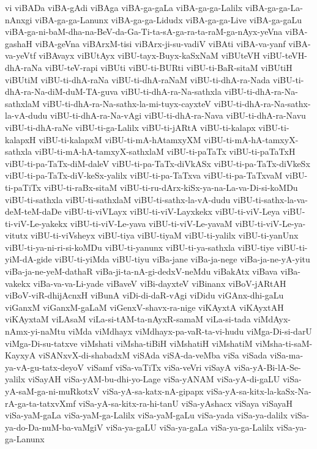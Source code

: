 {vi
viBADa
viBA-gAdi
viBAga
viBA-ga-gaLa
viBA-ga-ga-Lalilx
viBA-ga-ga-La-nAnxgi
viBA-ga-ga-Lanunx
viBA-ga-ga-Lidudx
viBA-ga-ga-Live
viBA-ga-gaLu
viBA-ga-ni-baM-dha-na-BeV-da-Ga-Ti-ta-sA-ga-ra-ta-raM-ga-nAyx-yeVna
viBA-gashaH
viBA-geVna
viBArxM-tisi
viBArx-ji-su-vadiV
viBAti
viBA-va-yanf
viBA-va-yeVtf
viBAvayx
viBUtAyx
viBU-tayx-Buyx-kaSxNaM
viBUteVH
viBU-teVH-dhA-raNa
viBU-teV-rapi
viBUti
viBU-ti-BURti
viBU-ti-BaR-sitaM
viBUtiH
viBUtiM
viBU-ti-dhA-raNa
viBU-ti-dhA-raNaM
viBU-ti-dhA-ra-Nada
viBU-ti-dhA-ra-Na-diM-duM-TA-guva
viBU-ti-dhA-ra-Na-sathxla
viBU-ti-dhA-ra-Na-sathxlaM
viBU-ti-dhA-ra-Na-sathx-la-mi-tuyx-cayxteV
viBU-ti-dhA-ra-Na-sathx-la-vA-dudu
viBU-ti-dhA-ra-Na-vAgi
viBU-ti-dhA-ra-Nava
viBU-ti-dhA-ra-Navu
viBU-ti-dhA-raNe
viBU-ti-ga-Lalilx
viBU-ti-jARtA
viBU-ti-kalapx
viBU-ti-kalapxH
viBU-ti-kalapxM
viBU-ti-mA-hAtamxyXM
viBU-ti-mA-hA-tamxyX-sathxla
viBU-ti-mA-hA-tamxyX-sathxlaM
viBU-ti-paTaTx
viBU-ti-paTaTxH
viBU-ti-pa-TaTx-diM-daleV
viBU-ti-pa-TaTx-diVkASx
viBU-ti-pa-TaTx-diVkeSx
viBU-ti-pa-TaTx-diV-keSx-yalilx
viBU-ti-pa-TaTxva
viBU-ti-pa-TaTxvaM
viBU-ti-paTiTx
viBU-ti-raBx-sitaM
viBU-ti-ru-dArx-kiSx-ya-na-La-va-Di-si-koMDu
viBU-ti-sathxla
viBU-ti-sathxlaM
viBU-ti-sathx-la-vA-dudu
viBU-ti-sathx-la-va-deM-teM-daDe
viBU-ti-viVLayx
viBU-ti-viV-Layxkekx
viBU-ti-viV-Leya
viBU-ti-viV-Le-yakekx
viBU-ti-viV-Le-yava
viBU-ti-viV-Le-yavaM
viBU-ti-viV-Le-ya-vitutx
viBU-ti-viVsheyx
viBU-tiya
viBU-tiyaM
viBU-ti-yalilx
viBU-ti-yanUnx
viBU-ti-ya-ni-ri-si-koMDu
viBU-ti-yanunx
viBU-ti-ya-sathxla
viBU-tiye
viBU-ti-yiM-dA-gide
viBU-ti-yiMda
viBU-tiyu
viBa-jane
viBa-ja-nege
viBa-ja-ne-yA-yitu
viBa-ja-ne-yeM-dathaR
viBa-ji-ta-nA-gi-dedxV-neMdu
viBakAtx
viBava
viBa-vakekx
viBa-va-va-Li-yade
viBaveV
viBi-dayxteV
viBinanx
viBoV-jARtAH
viBoV-viR-dhijAcnxH
viBunA
viDi-di-daR-vAgi
viDidu
viGAnx-dhi-gaLu
viGanxM
viGanxM-gaLaM
viGenxV-shavx-ra-nige
viKAyxtA
viKAyxtAH
viKAyxtaM
viLAsaM
viLa-si-tAM-ta-nAyxR-samaM
viLa-si-tada
viMdAyx-nAmx-yi-naMtu
viMda
viMdhayx
viMdhayx-pa-vaR-ta-vi-hudu
viMga-Di-si-darU
viMga-Di-su-tatxve
viMshati
viMsha-tiBiH
viMshatiH
viMshatiM
viMsha-ti-saM-KayxyA
viSANxvX-di-shabadxM
viSAda
viSA-da-veMba
viSa
viSada
viSa-ma-ya-vA-gu-tatx-deyoV
viSamf
viSa-vaTiTx
viSa-veVri
viSayA
viSa-yA-Bi-lA-Se-yalilx
viSayAH
viSa-yAM-bu-dhi-yo-Lage
viSa-yANAM
viSa-yA-di-gaLU
viSa-yA-saM-ga-ni-muRkotxV
viSa-yA-sa-katx-nA-gipapx
viSa-yA-sa-kitx-la-kaSx-Na-rA-ga-ta-tatxvXmf
viSa-yA-sa-kitx-ra-hi-tanU
viSa-yAshacx
viSaya
viSayaH
viSa-yaM-gaLa
viSa-yaM-ga-Lalilx
viSa-yaM-gaLu
viSa-yada
viSa-ya-dalilx
viSa-ya-do-Da-nuM-ba-vaMgiV
viSa-ya-gaLU
viSa-ya-gaLa
viSa-ya-ga-Lalilx
viSa-ya-ga-Lanunx
}
